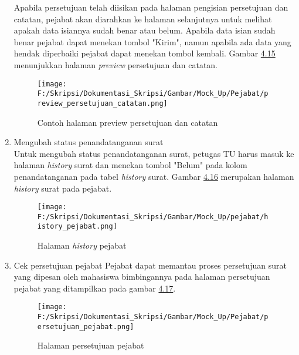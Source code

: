 \begin{enumerate}
	Apabila persetujuan telah diisikan pada halaman pengisian persetujuan dan catatan, pejabat akan diarahkan ke halaman selanjutnya untuk melihat apakah data isiannya sudah benar atau belum. Apabila data isian sudah benar pejabat dapat menekan tombol "Kirim", namun apabila ada data yang hendak diperbaiki pejabat dapat menekan tombol kembali. Gambar \hyperlink{halaman_preview_persetujuan_dan_catatan}{4.15} menunjukkan halaman \textit{preview} persetujuan dan catatan.
	\begin{figure}[H]
	\centering
		\texttt{[image: F:/Skripsi/Dokumentasi\_Skripsi/Gambar/Mock\_Up/Pejabat/preview\_persetujuan\_catatan.png]}
		\caption{Contoh halaman preview persetujuan dan catatan}
		\label{fig:halaman_preview_persetujuan_dan_catatan}
	\end{figure}
	
	\item Mengubah status penandatanganan surat \\
	Untuk mengubah status penandatanganan surat, petugas TU harus masuk ke halaman \textit{history} surat dan menekan tombol "Belum" pada kolom penandatanganan pada tabel \textit{history} surat. Gambar \hyperlink{halaman_history_pejabat}{4.16} merupakan halaman \textit{history} surat pada pejabat.
	\begin{figure}[H]
	\centering
		\texttt{[image: F:/Skripsi/Dokumentasi\_Skripsi/Gambar/Mock\_Up/pejabat/history\_pejabat.png]}
		\caption{Halaman \textit{history} pejabat}
		\label{fig:halaman_history_pejabat}
	\end{figure}

	\item Cek persetujuan pejabat
	Pejabat dapat memantau proses persetujuan surat yang dipesan oleh mahasiswa bimbingannya pada halaman persetujuan pejabat yang ditampilkan pada gambar \hyperlink{halaman_persetujuan_pejabat}{4.17}.
	\begin{figure}[H]
	\centering
		\texttt{[image: F:/Skripsi/Dokumentasi\_Skripsi/Gambar/Mock\_Up/Pejabat/persetujuan\_pejabat.png]}
		\caption{Halaman persetujuan pejabat}
		\label{fig:halaman_persetujuan_pejabat}
	\end{figure}
\end{enumerate}

